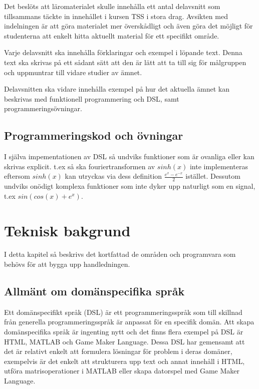 \documentclass[]{article}
\begin{document}
Det beslöts att läromaterialet skulle innehålla ett antal delavsnitt som
tillsammans täckte in innehållet i kursen TSS i stora drag.
Avsikten med indelningen är att göra materialet mer överskådligt och
även göra det möjligt för studenterna att enkelt hitta aktuellt material
för ett specifikt område.

Varje delavsnitt ska innehålla förklaringar och exempel i löpande text.
Denna text ska skrivas på ett sådant sätt att den är lätt att ta till
sig för målgruppen och uppmuntrar till vidare studier av ämnet.

Delavsnitten ska vidare innehålla exempel på hur det aktuella ämnet kan
beskrivas med funktionell programmering och DSL, samt programmeringsövningar.

\subsection{Programmeringskod och övningar}

I själva impementationen av DSL så undviks funktioner som är
ovanliga eller kan skrivas explicit. t.ex så ska fouriertransformen av
$sinh(x)$ inte implementeras eftersom $sinh(x)$ kan utryckas via dess
definition $\frac{e^{x} - e^{-x}}{2}$ istället.
Dessutom undviks onödigt komplexa funktioner som inte
dyker upp naturligt som en signal, t.ex $sin(cos(x)+e^x)$.

\section{Teknisk bakgrund}
I detta kapitel så beskrivs det kortfattad de områden och programvara som
behövs för att bygga upp handledningen.

\subsection{Allmänt om domänspecifika språk}
Ett domänspecifikt språk (\gls{DSL}) är ett programmeringsspråk som till
skillnad från generella programmeringsspråk är anpassat för en
specifik domän. Att skapa domänspecifika språk är ingenting nytt och det
finns flera exempel på DSL är HTML, MATLAB och Game Maker Language.
Dessa DSL har gemensamt att det är relativt enkelt att formulera lösningar för
problem i deras domäner, exempelvis är det enkelt att strukturera upp text och
annat innehåll i HTML, utföra matrisoperationer i MATLAB eller skapa datorspel
med Game Maker Language.
\end{document}
